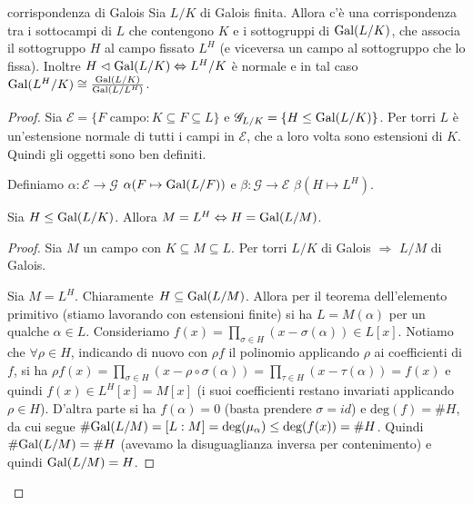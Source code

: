 \begin{theorem}{corrispondenza di Galois}
    Sia $L/K$ di Galois finita. Allora c'è una corrispondenza tra i sottocampi di $L$ che contengono $K$ e i sottogruppi di $ \text{Gal}(L/K)$, che associa il sottogruppo $H$ al campo fissato $L^H$ (e viceversa un campo al sottogruppo che lo fissa). Inoltre $H \vartriangleleft \text{Gal}(L/K) \Leftrightarrow L^H/K$ è normale e in tal caso $\text{Gal}(L^H/K) \cong \frac{\text{Gal}(L/K)}{\text{Gal}(L/L^H)}$.
\end{theorem}
\begin{proof}
    Sia $\mathscr{E} = \{ F \text{ campo} : K \subseteq F \subseteq L\}$ e $\mathscr{G}_{L/K} = \{ H \leq \text{Gal}(L/K)\}$. Per torri $L$ è un'estensione normale di tutti i campi in $\mathscr{E}$, che a loro volta sono estensioni di $K$. Quindi gli oggetti sono ben definiti.
    
    Definiamo $\alpha: \mathscr{E} \rightarrow \mathscr{G}$ $\alpha(F \mapsto \text{Gal}(L/F))$ e $\beta: \mathscr{G} \rightarrow \mathscr{E}$ $\beta(H \mapsto L^H)$.

    \begin{lemma2}
        Sia $H \leq \text{Gal}(L/K)$. Allora $M = L^H \Leftrightarrow H = \text{Gal}(L/M)$.
    \end{lemma2}
    \begin{proof}
        Sia $M$ un campo con $K \subseteq M \subseteq L$. Per torri $L/K$ di Galois $\Rightarrow$ $L/M$ di Galois.
    
        Sia $M = L^H$. Chiaramente $H \subseteq \text{Gal}(L/M)$. Allora per il teorema dell'elemento primitivo (stiamo lavorando con estensioni finite) si ha $L = M(\alpha)$ per un qualche $\alpha \in L$. Consideriamo $f(x) = \prod_{\sigma \in H} (x - \sigma(\alpha)) \in L[x]$. Notiamo che  $\forall \rho \in H$, indicando di nuovo con $ \rho f$ il polinomio applicando $\rho $ ai coefficienti di $f$, si ha $\rho f(x) = \prod_{\sigma \in H} (x - \rho\circ\sigma(\alpha)) =  \prod_{\tau \in H} (x - \tau(\alpha)) = f(x)$ e quindi $f(x) \in L^H[x] = M[x]$ (i suoi coefficienti restano invariati applicando $\rho \in H$). D'altra parte si ha $f(\alpha) = 0$ (basta prendere $\sigma = id$) e $\text{deg}(f) = \#H$, da cui segue $\#\text{Gal}(L/M) = [L:M] = \text{deg}(\mu_{\alpha}) \leq \text{deg}(f(x)) = \#H$. Quindi $\#\text{Gal}(L/M) = \#H$ (avevamo la disuguaglianza inversa per contenimento) e quindi $\text{Gal}(L/M) = H$.
    

\end{proof}
\end{proof}
